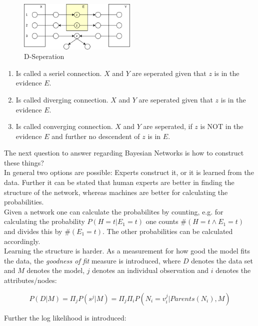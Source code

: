 \documentclass[12pt,a4paper]{article}
\begin{document}
\begin{figure}[ht]
    \begin{center}
    \includegraphics[width=0.5\textwidth]{imgs/d-sep.png}
    \caption{D-Seperation}
    \label{fig:d-sep}
    \end{center}
\end{figure}

\begin{enumerate}
    \item Is called a seriel connection. \(X\) and \(Y\) are seperated given that \(z\) is in the evidence \(E\).
    \item Is called diverging connection. \(X\) and \(Y\) are seperated given that \(z\) is in the evidence \(E\).
    \item Is called converging connection. \(X\) and \(Y\) are seperated, if \(z\) is NOT in the evidence \(E\) and further no descendent of \(z\) is in \(E\).
\end{enumerate}

\noindent The next question to answer regarding Bayesian Networks is how to construct these things?\\
In general two options are possible: Experts construct it, or it is learned from the data. Further it can be stated that human experts are better in finding the structure of the network, whereas machines are better for calculating the probabilities.\\
Given a network one can calculate the probabilites by counting, e.g. for calculating the probability \(P(H = t | E_1 = t)\) one counts \(\#(H = t \land E_1 = t)\) and divides this by \(\#(E_1 = t)\). The other probabilities can be calculated accordingly.\\
Learning the structure is harder. As a measurement for how good the model fits the data, the \textit{goodness of fit} measure is introduced, where \(D\) denotes the data set and \(M\) denotes the model, \(j\) denotes an individual observation and \(i\) denotes the attributes/nodes:

\[P(D|M) = \Pi_j P(s^j | M) = \Pi_j \Pi_i P(N_i = v_i^j | Parents(N_i), M)\]

\noindent Further the log likelihood is introduced:
\end{document}

